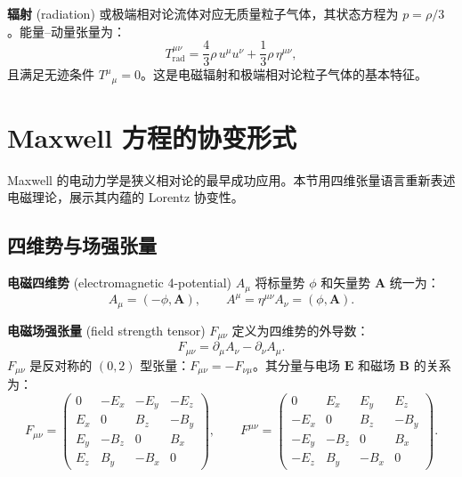 \begin{definition}[辐射]
\textbf{辐射} (radiation) 或极端相对论流体对应无质量粒子气体，其状态方程为 $p = \rho/3$。能量--动量张量为：
\begin{equation}
    T^{\mu\nu}_{\text{rad}} = \frac{4}{3}\rho\,u^\mu u^\nu + \frac{1}{3}\rho\,\eta^{\mu\nu},
\end{equation}
且满足无迹条件 $T^\mu{}_\mu = 0$。这是电磁辐射和极端相对论粒子气体的基本特征。
\end{definition}

\section{Maxwell 方程的协变形式}

Maxwell 的电动力学是狭义相对论的最早成功应用。本节用四维张量语言重新表述电磁理论，展示其内蕴的 Lorentz 协变性。

\subsection{四维势与场强张量}

\begin{definition}[电磁四维势]
\textbf{电磁四维势} (electromagnetic 4-potential) $A_\mu$ 将标量势 $\phi$ 和矢量势 $\mathbf{A}$ 统一为：
\begin{equation}
    A_\mu = (-\phi, \mathbf{A}), \qquad A^\mu = \eta^{\mu\nu}A_\nu = (\phi, \mathbf{A}).
\end{equation}
\end{definition}

\begin{definition}[电磁场强张量]
\textbf{电磁场强张量} (field strength tensor) $F_{\mu\nu}$ 定义为四维势的外导数：
\begin{equation}\label{eq:F_definition}
    \boxed{F_{\mu\nu} = \partial_\mu A_\nu - \partial_\nu A_\mu}.
\end{equation}
$F_{\mu\nu}$ 是反对称的 $(0,2)$ 型张量：$F_{\mu\nu} = -F_{\nu\mu}$。其分量与电场 $\mathbf{E}$ 和磁场 $\mathbf{B}$ 的关系为：
\begin{equation}\label{eq:F_components}
    F_{\mu\nu} = \begin{pmatrix}
        0 & -E_x & -E_y & -E_z \\
        E_x & 0 & B_z & -B_y \\
        E_y & -B_z & 0 & B_x \\
        E_z & B_y & -B_x & 0
    \end{pmatrix}, \qquad
    F^{\mu\nu} = \begin{pmatrix}
        0 & E_x & E_y & E_z \\
        -E_x & 0 & B_z & -B_y \\
        -E_y & -B_z & 0 & B_x \\
        -E_z & B_y & -B_x & 0
    \end{pmatrix}.
\end{equation}
\end{definition}

